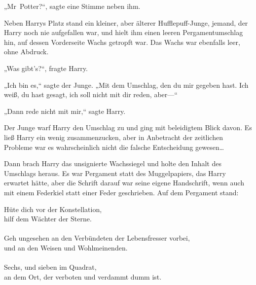 „Mr~Potter?“, sagte eine Stimme neben ihm.

Neben Harrys Platz stand ein kleiner, aber älterer Hufflepuff-Junge, jemand, der Harry noch nie aufgefallen war, und hielt ihm einen leeren Pergamentumschlag hin, auf dessen Vorderseite Wachs getropft war. Das Wachs war ebenfalls leer, ohne Abdruck.

„Was gibt's?“, fragte Harry.

„Ich bin es,“ sagte der Junge. „Mit dem Umschlag, den du mir gegeben hast. Ich weiß, du hast gesagt, ich soll nicht mit dir reden, aber—“

„Dann rede nicht mit mir,“ sagte Harry.

Der Junge warf Harry den Umschlag zu und ging mit beleidigtem Blick davon. Es ließ Harry ein wenig zusammenzucken, aber in Anbetracht der zeitlichen Probleme war es wahrscheinlich nicht die falsche Entscheidung gewesen…

Dann brach Harry das unsignierte Wachssiegel und holte den Inhalt des Umschlags heraus. Es war Pergament statt des Muggelpapiers, das Harry erwartet hätte, aber die Schrift darauf war seine eigene Handschrift, wenn auch mit einem Federkiel statt einer Feder geschrieben. Auf dem Pergament stand:

\begin{writtenNote}
Hüte dich vor der Konstellation,\\
hilf dem Wächter der Sterne.\\
\\
Geh ungesehen an den Verbündeten der Lebensfresser vorbei,\\
und an den Weisen und Wohlmeinenden.\\
\\
Sechs, und sieben im Quadrat,\\
an dem Ort, der verboten und verdammt dumm ist.
\end{writtenNote}

